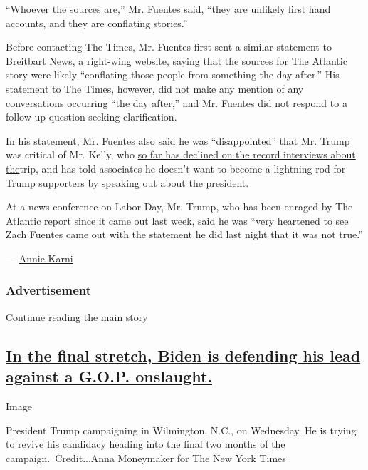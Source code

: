 ``Whoever the sources are,'' Mr. Fuentes said, ``they are unlikely first
hand accounts, and they are conflating stories.''

Before contacting The Times, Mr. Fuentes first sent a similar statement
to Breitbart News, a right-wing website, saying that the sources for The
Atlantic story were likely ``conflating those people from something the
day after.'' His statement to The Times, however, did not make any
mention of any conversations occurring ``the day after,'' and Mr.
Fuentes did not respond to a follow-up question seeking clarification.

In his statement, Mr. Fuentes also said he was ``disappointed'' that Mr.
Trump was critical of Mr. Kelly, who
\href{https://www.nytimes3xbfgragh.onion/2020/09/04/us/politics/kelly-trump.html}{so
far has declined on the record interviews about the}trip, and has told
associates he doesn't want to become a lightning rod for Trump
supporters by speaking out about the president.

At a news conference on Labor Day, Mr. Trump, who has been enraged by
The Atlantic report since it came out last week, said he was ``very
heartened to see Zach Fuentes came out with the statement he did last
night that it was not true.''

--- \href{https://www.nytimes3xbfgragh.onion/by/annie-karni}{Annie
Karni}

\hypertarget{advertisement-2}{%
\subsubsection{Advertisement}\label{advertisement-2}}

\protect\hyperlink{after-dfp-ad-mid3}{Continue reading the main story}

\hypertarget{in-the-final-stretch-biden-is-defending-his-lead-against-a-gop-onslaught}{%
\subsection{\texorpdfstring{\protect\hyperlink{in-the-final-stretch-biden-is-defending-his-lead-against-a-gop-onslaught}{In
the final stretch, Biden is defending his lead against a G.O.P.
onslaught.}}{In the final stretch, Biden is defending his lead against a G.O.P. onslaught.}}\label{in-the-final-stretch-biden-is-defending-his-lead-against-a-gop-onslaught}}

Image

President Trump campaigning in Wilmington, N.C., on Wednesday. He is
trying to revive his candidacy heading into the final two months of the
campaign.~Credit...Anna Moneymaker for The New York Times

